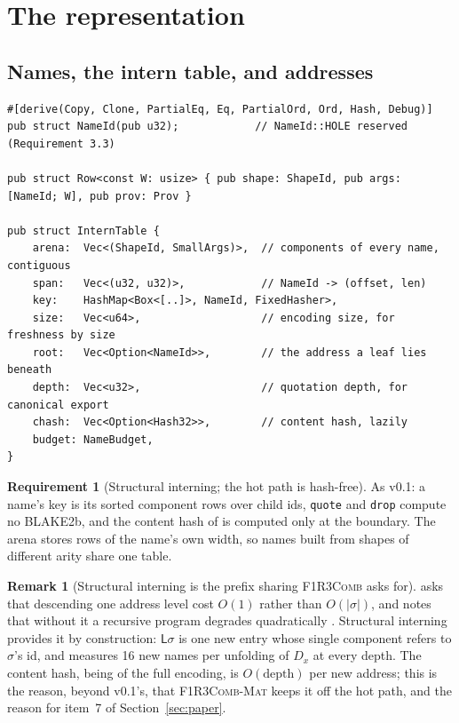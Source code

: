 \documentclass[11pt,a4paper]{article}
\newcommand{\code}[1]{\texttt{#1}}
\newcommand{\Comb}{\textsc{F1R3Comb}}
\newcommand{\Mat}{\textsc{F1R3Comb-Mat}}
\theoremstyle{definition}
\newtheorem{requirement}[definition]{Requirement}
\newtheorem{remark}[definition]{Remark}
\theoremstyle{plain}
\newcommand{\Lft}{\mathsf{L}}
\begin{document}
\section{The representation}\label{sec:rep}

\subsection{Names, the intern table, and addresses}

\begin{lstlisting}
#[derive(Copy, Clone, PartialEq, Eq, PartialOrd, Ord, Hash, Debug)]
pub struct NameId(pub u32);            // NameId::HOLE reserved (Requirement 3.3)

pub struct Row<const W: usize> { pub shape: ShapeId, pub args: [NameId; W], pub prov: Prov }

pub struct InternTable {
    arena:  Vec<(ShapeId, SmallArgs)>,  // components of every name, contiguous
    span:   Vec<(u32, u32)>,            // NameId -> (offset, len)
    key:    HashMap<Box<[..]>, NameId, FixedHasher>,
    size:   Vec<u64>,                   // encoding size, for freshness by size
    root:   Vec<Option<NameId>>,        // the address a leaf lies beneath
    depth:  Vec<u32>,                   // quotation depth, for canonical export
    chash:  Vec<Option<Hash32>>,        // content hash, lazily
    budget: NameBudget,
}
\end{lstlisting}

\begin{requirement}[Structural interning; the hot path is hash-free]
\label{req:hashfree}
As v0.1: a name's key is its sorted component rows over child ids, \code{quote}
and \code{drop} compute no BLAKE2b, and the content hash of
\cite[Req.~4.10]{combspec} is computed only at the boundary. The arena stores
rows of the name's own width, so names built from shapes of different arity
share one table.
\end{requirement}

\begin{remark}[Structural interning is the prefix sharing \Comb{} asks for]
\cite[Req.~9.7]{combspec} asks that descending one address level cost $O(1)$
rather than $O(|\sigma|)$, and notes that without it a recursive program
degrades quadratically \cite[Req.~13.1]{combspec}. Structural interning
provides it by construction: $\Lft\sigma$ is one new entry whose single
component refers to $\sigma$'s id, and \cite[Find.~14.4]{matnote} measures 16
new names per unfolding of $D_{x}$ at every depth. The content hash, being
of the full encoding, is $O(\text{depth})$ per new address; this is the
reason, beyond v0.1's, that \Mat{} keeps it off the hot path, and the
reason for item~7 of Section~\ref{sec:paper}.
\end{remark}
\end{document}
